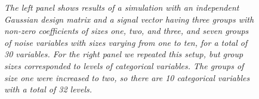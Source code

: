 \documentclass{imsart}
\begin{document}
\begin{figure}
\begin{center}
\hspace{-15pt}
\caption{\small \it The left panel shows results of a simulation with
  an independent Gaussian design matrix and a signal vector having
  three groups with non-zero coefficients of sizes one, two, and
  three, and seven groups of noise variables with sizes varying from
  one to ten, for a total of 30 variables. For the right panel we
  repeated this setup, but group sizes corresponded to levels of
  categorical variables. The groups of size one were increased to two,
so there are 10 categorical variables with a total of 32 levels.}
\end{center}
\end{figure}




\label{fig:smallselection}


\end{document}
